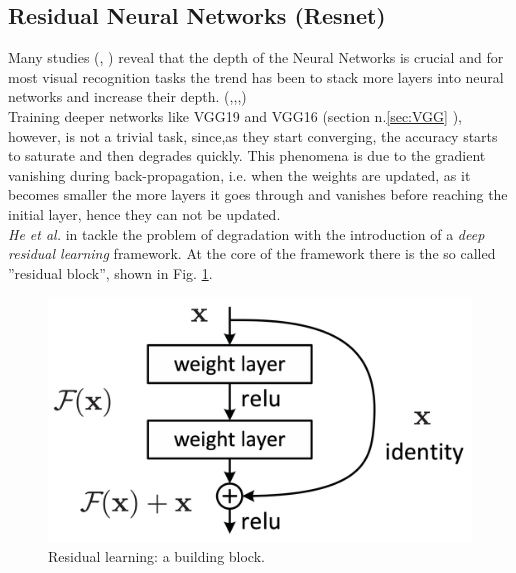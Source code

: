 \subsection[Residual Neural Networks]{Residual Neural Networks (Resnet)}
Many studies (\citep{simonyan2015deep}, \cite{szegedy2014going}) reveal that the depth of the Neural Networks is crucial and for most visual recognition tasks the trend has been to stack more layers into neural networks and increase their depth. (\cite{simonyan2015deep},\cite{ioffe2015batch},\cite{girshick2014rich},\cite{2014Spatial})\\
Training deeper networks like VGG19 and VGG16 (section n.\ref{sec:VGG} ), however, is not a trivial task, since,as they start converging, the accuracy starts to saturate and then degrades quickly. This phenomena is due to the gradient vanishing during back-propagation, i.e. when the weights are updated, as it becomes smaller the more layers it goes through and vanishes before reaching the initial layer, hence they can not be updated.  \\
\textit{He et al. } in \cite{DBLP:journals/corr/HeZRS15} tackle the problem of degradation with the introduction of a \textit{deep residual learning} framework. At the core of the framework there is the so called ''residual block'', shown in Fig. \ref{fig:res_block}. 
\begin{figure}[htb]
    \centering
    \includegraphics[scale = 0.3]{img/res_block.png}
    \caption[Residual learning: a building block]{Residual learning: a building block. \cite{DBLP:journals/corr/HeZRS15}}
    \label{fig:res_block}
\end{figure}

